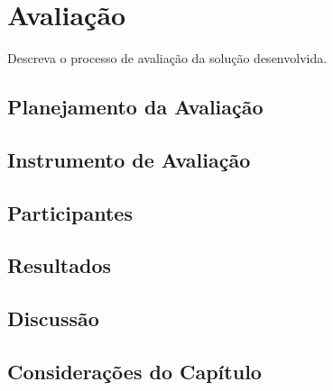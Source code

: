 
\chapter{Avaliação}
\label{cap:avaliacao}

Descreva o processo de avaliação da solução desenvolvida.

\section{Planejamento da Avaliação}

\section{Instrumento de Avaliação}

\section{Participantes}

\section{Resultados}

\section{Discussão}

\section{Considerações do Capítulo}

